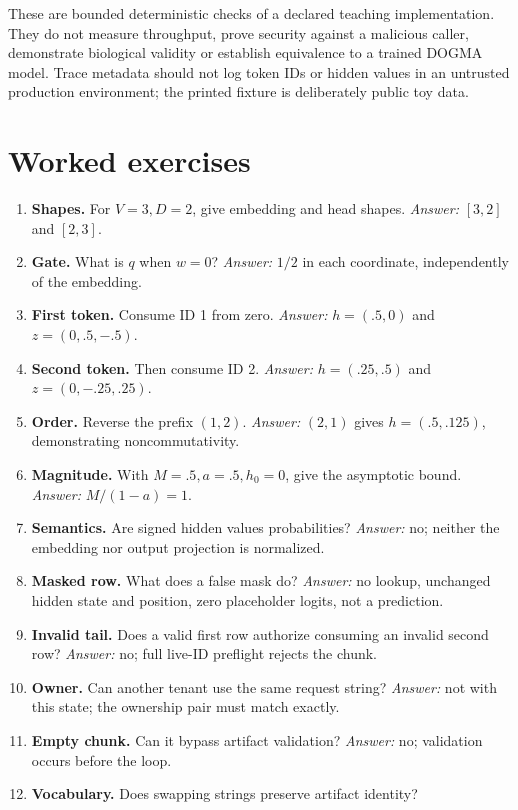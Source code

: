 These are bounded deterministic checks of a declared teaching implementation.
They do not measure throughput, prove security against a malicious caller,
demonstrate biological validity or establish equivalence to a trained DOGMA
model. Trace metadata should not log token IDs or hidden values in an untrusted
production environment; the printed fixture is deliberately public toy data.

\section{Worked exercises}
\begin{enumerate}
\item \textbf{Shapes.} For $V=3,D=2$, give embedding and head shapes.
\emph{Answer:} $[3,2]$ and $[2,3]$.
\item \textbf{Gate.} What is $q$ when $w=0$? \emph{Answer:} $1/2$ in each
coordinate, independently of the embedding.
\item \textbf{First token.} Consume ID 1 from zero. \emph{Answer:}
$h=(.5,0)$ and $z=(0,.5,-.5)$.
\item \textbf{Second token.} Then consume ID 2. \emph{Answer:}
$h=(.25,.5)$ and $z=(0,-.25,.25)$.
\item \textbf{Order.} Reverse the prefix $(1,2)$.
\emph{Answer:} $(2,1)$ gives $h=(.5,.125)$, demonstrating noncommutativity.
\item \textbf{Magnitude.} With $M=.5,a=.5,h_0=0$, give the asymptotic bound.
\emph{Answer:} $M/(1-a)=1$.
\item \textbf{Semantics.} Are signed hidden values probabilities?
\emph{Answer:} no; neither the embedding nor output projection is normalized.
\item \textbf{Masked row.} What does a false mask do?
\emph{Answer:} no lookup, unchanged hidden state and position, zero placeholder
logits, not a prediction.
\item \textbf{Invalid tail.} Does a valid first row authorize consuming an
invalid second row? \emph{Answer:} no; full live-ID preflight rejects the chunk.
\item \textbf{Owner.} Can another tenant use the same request string?
\emph{Answer:} not with this state; the ownership pair must match exactly.
\item \textbf{Empty chunk.} Can it bypass artifact validation?
\emph{Answer:} no; validation occurs before the loop.
\item \textbf{Vocabulary.} Does swapping strings preserve artifact identity?

\end{enumerate}

